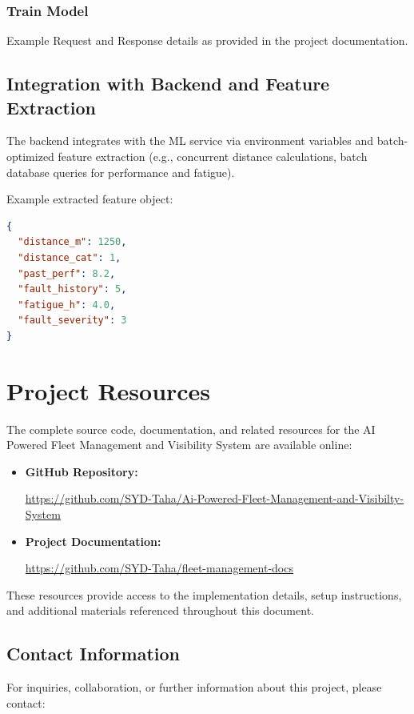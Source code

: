 \subsection{Train Model}

Example Request and Response details as provided in the project documentation.

\section{Integration with Backend and Feature Extraction}

The backend integrates with the ML service via environment variables and batch-optimized feature extraction (e.g., concurrent distance calculations, batch database queries for performance and fatigue).

Example extracted feature object:
\begin{lstlisting}[language=JSON, caption={Example Extracted Feature Object}, label={lst:feature_object}]
{
  "distance_m": 1250,
  "distance_cat": 1,
  "past_perf": 8.2,
  "fault_history": 5,
  "fatigue_h": 4.0,
  "fault_severity": 3
}
\end{lstlisting}

\chapter{Project Resources}
\label{app:project-resources}
The complete source code, documentation, and related resources for the AI Powered Fleet Management and Visibility System are available online:
\begin{itemize}
    \item \textbf{GitHub Repository:} 
    
    \url{https://github.com/SYD-Taha/Ai-Powered-Fleet-Management-and-Visibilty-System}
    
    \item \textbf{Project Documentation:} 
    
    \url{https://github.com/SYD-Taha/fleet-management-docs}
\end{itemize}
These resources provide access to the implementation details, setup instructions, and additional materials referenced throughout this document.

\section{Contact Information}
For inquiries, collaboration, or further information about this project, please contact:

